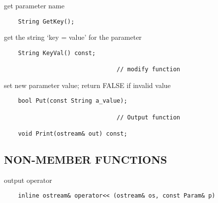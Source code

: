     get parameter name
\begin{verbatim}
    String GetKey();
\end{verbatim}

    get the string `key = value' for the parameter
\begin{verbatim}
    String KeyVal() const;

                                // modify function
\end{verbatim}

    set new parameter value; return FALSE if invalid value
\begin{verbatim}
    bool Put(const String a_value);

                                // Output function

    void Print(ostream& out) const;
\end{verbatim}

\subsection*{NON-MEMBER FUNCTIONS}
    output operator
\begin{verbatim}
    inline ostream& operator<< (ostream& os, const Param& p)
\end{verbatim}
